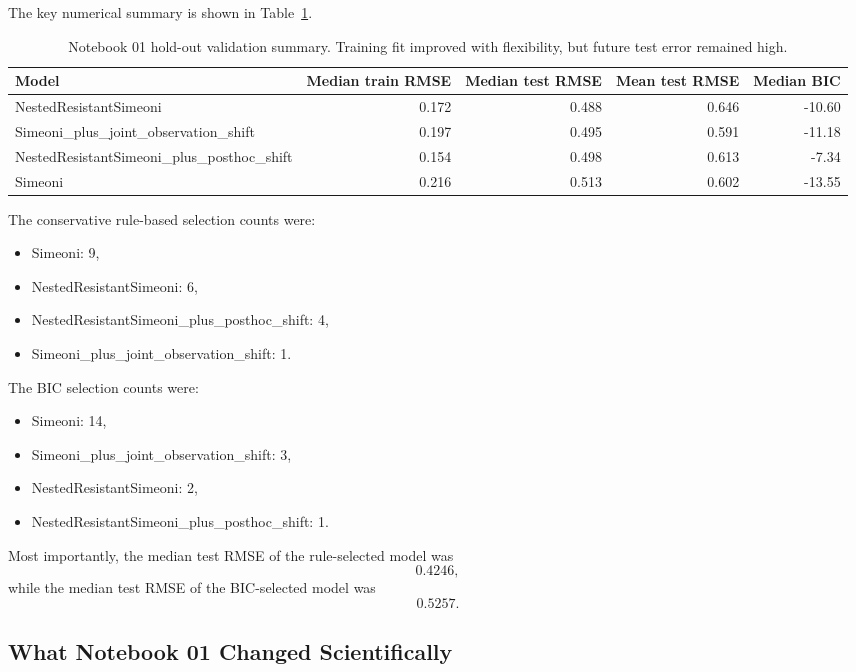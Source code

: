 \documentclass[11pt,a4paper]{article}
\begin{document}
The key numerical summary is shown in Table~\ref{tab:n01-results}.

\begin{table}[H]
\centering
\small
\caption{Notebook 01 hold-out validation summary. Training fit improved with flexibility, but future test error remained high.}
\label{tab:n01-results}
\begin{tabular}{lrrrr}
\toprule
Model & Median train RMSE & Median test RMSE & Mean test RMSE & Median BIC \\
\midrule
NestedResistantSimeoni & 0.172 & 0.488 & 0.646 & -10.60 \\
Simeoni\_plus\_joint\_observation\_shift & 0.197 & 0.495 & 0.591 & -11.18 \\
NestedResistantSimeoni\_plus\_posthoc\_shift & 0.154 & 0.498 & 0.613 & -7.34 \\
Simeoni & 0.216 & 0.513 & 0.602 & -13.55 \\
\bottomrule
\end{tabular}
\end{table}

The conservative rule-based selection counts were:
\begin{itemize}[leftmargin=2em]
    \item Simeoni: 9,
    \item NestedResistantSimeoni: 6,
    \item NestedResistantSimeoni\_plus\_posthoc\_shift: 4,
    \item Simeoni\_plus\_joint\_observation\_shift: 1.
\end{itemize}

The BIC selection counts were:
\begin{itemize}[leftmargin=2em]
    \item Simeoni: 14,
    \item Simeoni\_plus\_joint\_observation\_shift: 3,
    \item NestedResistantSimeoni: 2,
    \item NestedResistantSimeoni\_plus\_posthoc\_shift: 1.
\end{itemize}

Most importantly, the median test RMSE of the rule-selected model was
\[
    0.4246,
\]
while the median test RMSE of the BIC-selected model was
\[
    0.5257.
\]

\subsection{What Notebook 01 Changed Scientifically}
\end{document}
